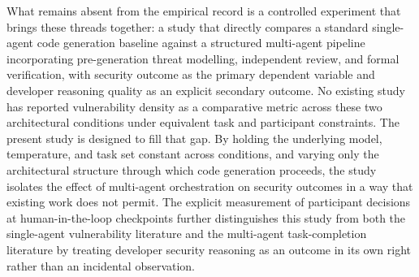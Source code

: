 What remains absent from the empirical record is a controlled experiment that brings these threads together: a study that directly compares a standard single-agent code generation baseline against a structured multi-agent pipeline incorporating pre-generation threat modelling, independent review, and formal verification, with security outcome as the primary dependent variable and developer reasoning quality as an explicit secondary outcome. No existing study has reported vulnerability density as a comparative metric across these two architectural conditions under equivalent task and participant constraints. The present study is designed to fill that gap. By holding the underlying model, temperature, and task set constant across conditions, and varying only the architectural structure through which code generation proceeds, the study isolates the effect of multi-agent orchestration on security outcomes in a way that existing work does not permit. The explicit measurement of participant decisions at human-in-the-loop checkpoints further distinguishes this study from both the single-agent vulnerability literature and the multi-agent task-completion literature by treating developer security reasoning as an outcome in its own right rather than an incidental observation.





